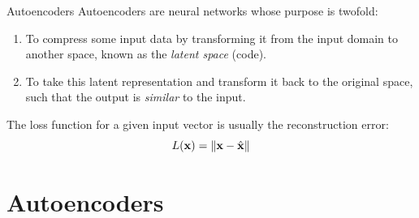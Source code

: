 \documentclass[handout,xcolor=pdftex,dvipsnames,table,mathserif]{beamer}
\begin{document}
\begin{frame}{Autoencoders}
Autoencoders are neural networks whose purpose is twofold:
\begin{enumerate}
\item To compress some input data by transforming it from the input domain to another space,
known as the \emph{latent space} (code).
\item To take this latent representation and transform it back to the original space, such that the output is \emph{similar} to the input.
\end{enumerate}

\begin{figure}
\centering
{}
\end{figure}

The loss function for a given input vector is usually the reconstruction error:
\[
L(\mathbf{x}) = \norm{ \mathbf{x}-\hat{\mathbf{x}}}
\]


\end{frame}


\section{Autoencoders}
\end{document}
